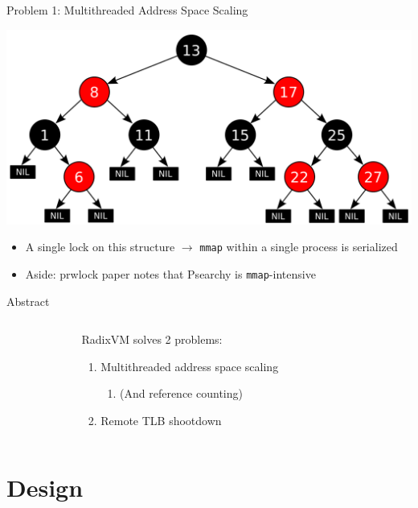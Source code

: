 \documentclass[aspectratio=169]{beamer}
\newcommand{\bi}{\begin{itemize}}
\newcommand{\ei}{\end{itemize}}
\newcommand{\bn}{\begin{enumerate}}
\newcommand{\en}{\end{enumerate}}
\begin{document}
\begin{frame}{Problem 1: Multithreaded Address Space Scaling}
  \begin{center}
    \includegraphics[scale=0.2]{./figures/Red-black_tree.png}
  \end{center}
    \bi
  \item {\color{red}A single lock on this structure} $\rightarrow$ \texttt{mmap} within a single process is serialized
    \pause
    \item Aside: prwlock paper notes that Psearchy is \texttt{mmap}-intensive
    \ei
\end{frame}

\begin{frame}{Abstract}
  \begin{columns}[T]
    \begin{column}{0.3\textwidth}
    \end{column}
    \begin{column}{0.4\textwidth}
      RadixVM solves 2 problems:
      \bn
    \item {\color<2>{red}Multithreaded address space scaling}
      \bn
    \item (And reference counting)
      \en
    \item Remote TLB shootdown
      \en
    \end{column}
    \begin{column}{0.3\textwidth}
    \end{column}
  \end{columns}
\end{frame}

\section{Design}
\end{document}
